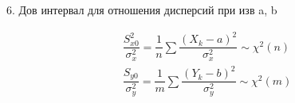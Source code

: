 6. Дов интервал для отношения дисперсий при изв a, b

\begin{multline*}
  \dfrac{S_{x0}^2}{\sigma_x^2} = \dfrac{1}{n}\sum \dfrac{(X_k-a)^2}{\sigma_x^2}\sim \chi^2(n) \\
  \dfrac{S_{y0}}{\sigma_y^2} = \dfrac{1}{m} \sum \dfrac{(Y_k - b)^2}{\sigma_y^2} \sim \chi^2 (m)
\end{multline*}

